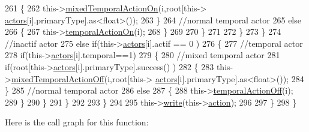 \begin{DoxyCode}
261                         \{
262                             this->\hyperlink{class_jetpack_af44bc8a08818e4433dfb1c7104601f12}{mixedTemporalActionOn}(i,root[this->
      \hyperlink{class_jetpack_a7e16d2f97837f9712a2e6de1c50d99db}{actors}[i].primaryType].as<float>());
263                         \}
264                         \textcolor{comment}{//normal temporal actor}
265                         \textcolor{keywordflow}{else}
266                         \{
267                             this->\hyperlink{class_jetpack_ad011d904f639accb5f94ef806846ef59}{temporalActionOn}(i);
268                         \}
269                                             
270                     \}
271 
272                 \}
273             \}
274             \textcolor{comment}{//inactif actor}
275             \textcolor{keywordflow}{else} \textcolor{keywordflow}{if}(this->\hyperlink{class_jetpack_a7e16d2f97837f9712a2e6de1c50d99db}{actors}[i].actif == 0 )
276             \{
277                 \textcolor{comment}{//temporal actor}
278                 \textcolor{keywordflow}{if}(this->\hyperlink{class_jetpack_a7e16d2f97837f9712a2e6de1c50d99db}{actors}[i].temporal==1)
279                 \{
280                     \textcolor{comment}{//mixed temporal actor}
281                     \textcolor{keywordflow}{if}(root[this->\hyperlink{class_jetpack_a7e16d2f97837f9712a2e6de1c50d99db}{actors}[i].primaryType].success() )
282                     \{
283                         this->\hyperlink{class_jetpack_af2f567ef6311a8fc2f7bb948837667b7}{mixedTemporalActionOff}(i,root[this->
      \hyperlink{class_jetpack_a7e16d2f97837f9712a2e6de1c50d99db}{actors}[i].primaryType].as<float>());
284                     \}
285                     \textcolor{comment}{//normal temporal actor}
286                     \textcolor{keywordflow}{else}
287                     \{
288                         this->\hyperlink{class_jetpack_a2991b302cd99bf89325f9b66b104d575}{temporalActionOff}(i);
289                     \}
290                 \}           
291             \}
292 
293         \}
294 
295         this->\hyperlink{class_jetpack_a338f1af8cbc6504ac69b47c7328569b5}{write}(this->\hyperlink{class_jetpack_aca3142925a7b0834b34ae91d26af7765}{action});
296 
297     \} 
298 \}
\end{DoxyCode}
Here is the call graph for this function\+:\nopagebreak
